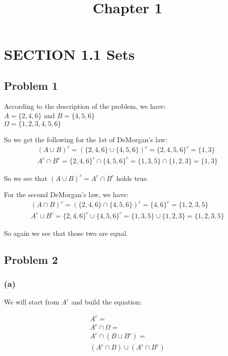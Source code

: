 \documentclass{article}
\title{Chapter 1}
\begin{document}
\date{}
\author{}

\maketitle

\section*{SECTION 1.1 Sets}

\subsection*{Problem 1}
According to the description of the problem, we have:\\
$A = \{2, 4, 6\}$ and $B = \{4, 5, 6\}$\\
$\Omega = \{1, 2, 3, 4, 5, 6\}$

So we get the following for the 1st of DeMorgan's law:
\begin{gather*}
    (A \cup B)^{c} =  (\{2, 4, 6\} \cup \{4, 5, 6 \})^{c} = \{2, 4, 5, 6\}^{c} = \{1, 3\} \\
    A^{c} \cap B^{c} = \{2, 4, 6\}^{c} \cap \{4, 5, 6\}^{c} = \{1, 3, 5\} \cap \{1, 2, 3\} = \{1, 3\} 
\end{gather*}

So we see that $(A \cup B)^{c} = A^{c} \cap B^{c}$ holds true.

For the second DeMorgan's law, we have:
\begin{gather*}
    (A \cap B)^{c} = (\{2, 4, 6\} \cap \{4, 5, 6\})^{c} = \{4, 6\}^{c} = \{1, 2, 3, 5\} \\
    A^{c} \cup B^{c} = \{2, 4, 6\}^{c} \cup \{4, 5, 6\}^{c} = \{1, 3, 5\} \cup \{1, 2, 3\} = \{1, 2, 3, 5\}
\end{gather*}

So again we see that those two are equal.

\subsection*{Problem 2}

\subsubsection*{(a)}

We will start from $A^{c}$ and build the equation:

\begin{gather*}
    A^{c} = \\
    A^{c} \cap \Omega = \\
    A^{c} \cap (B \cup B^{c}) = \\
    (A^{c} \cap B) \cup (A^{c} \cap B^{c})
\end{gather*}
\end{document}
